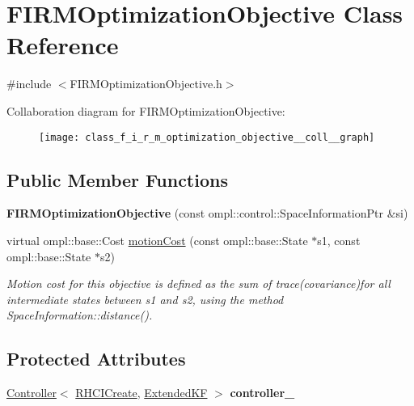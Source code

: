 \hypertarget{class_f_i_r_m_optimization_objective}{\section{\-F\-I\-R\-M\-Optimization\-Objective \-Class \-Reference}
\label{class_f_i_r_m_optimization_objective}
}


{\ttfamily \#include $<$\-F\-I\-R\-M\-Optimization\-Objective.\-h$>$}



\-Collaboration diagram for \-F\-I\-R\-M\-Optimization\-Objective\-:\nopagebreak
\begin{figure}[H]
\begin{center}
\leavevmode
\texttt{[image: class\_f\_i\_r\_m\_optimization\_objective\_\_coll\_\_graph]}
\end{center}
\end{figure}
\subsection*{\-Public \-Member \-Functions}
\begin{DoxyCompactItemize}
\item 
\hypertarget{class_f_i_r_m_optimization_objective_a230cd65e9c2c9d9d668eca55b9a9c537}{{\bfseries \-F\-I\-R\-M\-Optimization\-Objective} (const ompl\-::control\-::\-Space\-Information\-Ptr \&si)}\label{class_f_i_r_m_optimization_objective_a230cd65e9c2c9d9d668eca55b9a9c537}

\item 
\hypertarget{class_f_i_r_m_optimization_objective_a161f7e9f76e46cfb65a80109535c0bd1}{virtual ompl\-::base\-::\-Cost \hyperlink{class_f_i_r_m_optimization_objective_a161f7e9f76e46cfb65a80109535c0bd1}{motion\-Cost} (const ompl\-::base\-::\-State $\ast$s1, const ompl\-::base\-::\-State $\ast$s2)}\label{class_f_i_r_m_optimization_objective_a161f7e9f76e46cfb65a80109535c0bd1}

\begin{DoxyCompactList}\small\item\em \-Motion cost for this objective is defined as the sum of trace(covariance)for all intermediate states between {\itshape s1\/} and {\itshape s2\/}, using the method \-Space\-Information\-::distance(). \end{DoxyCompactList}\end{DoxyCompactItemize}
\subsection*{\-Protected \-Attributes}
\begin{DoxyCompactItemize}
\item 
\hypertarget{class_f_i_r_m_optimization_objective_ac8f288ac2a63ec1830889e2f146acbe6}{\hyperlink{class_controller}{\-Controller}$<$ \hyperlink{class_r_h_c_i_create}{\-R\-H\-C\-I\-Create}, \*
\hyperlink{class_extended_k_f}{\-Extended\-K\-F} $>$ {\bfseries controller\-\_\-}}\label{class_f_i_r_m_optimization_objective_ac8f288ac2a63ec1830889e2f146acbe6}

\end{DoxyCompactItemize}


